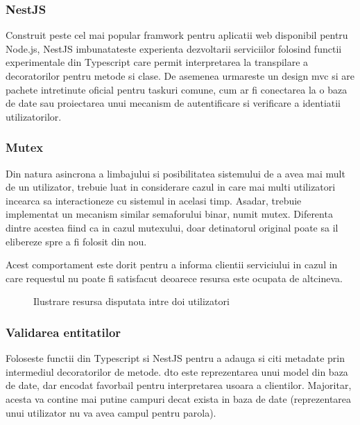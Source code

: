 \subsubsection {NestJS}

Construit peste cel mai popular framwork pentru aplicatii web disponibil pentru Node.js, NestJS imbunatateste experienta dezvoltarii serviciilor folosind functii experimentale din Typescript care permit interpretarea la transpilare a decoratorilor pentru metode si clase. De asemenea urmareste un design \acrshort{mvc} si are pachete intretinute oficial pentru taskuri comune, cum ar fi conectarea la o baza de date sau proiectarea unui mecanism de autentificare si verificare a identiatii utilizatorilor.

\subsubsection {Mutex}

Din natura asincrona a limbajului si posibilitatea sistemului de a avea mai mult de un utilizator, trebuie luat in considerare cazul in care mai multi utilizatori incearca sa interactioneze cu sistemul in acelasi timp. Asadar, trebuie implementat un mecanism similar semaforului binar, numit mutex. Diferenta dintre acestea fiind ca in cazul mutexului, doar detinatorul original poate sa il elibereze spre a fi folosit din nou.

Acest comportament este dorit pentru a informa clientii serviciului in cazul in care requestul nu poate fi satisfacut deoarece resursa este ocupata de altcineva.

\begin{figure}[H]
  \centering
  \caption{Ilustrare resursa disputata intre doi utilizatori}
\end{figure}


\subsubsection {Validarea entitatilor}

Foloseste functii din Typescript si NestJS pentru a adauga si citi metadate prin intermediul decoratorilor de metode. \acrfull{dto} este reprezentarea unui model din baza de date, dar encodat favorbail pentru interpretarea usoara a clientilor. Majoritar, acesta va contine mai putine campuri decat exista in baza de date (reprezentarea unui utilizator nu va avea campul pentru parola).

